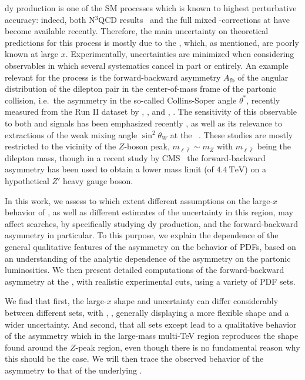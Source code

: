 \acrlong{dy} production is one of the SM processes which is known to highest
perturbative accuracy: indeed, both N$^3$\lo QCD results~\cite{Duhr:2021vwj} and
the full mixed \qcd-\ew corrections at \nnlo
\cite{Buccioni:2020cfi,Buccioni:2022kgy,Bonciani:2020tvf,Bonciani:2021zzf,Armadillo:2022bgm}
have become available recently.
%
Therefore, the main uncertainty on theoretical predictions for this process is
mostly due to the \pdfs, which, as mentioned, are poorly known at large $x$.
%
Experimentally, uncertainties are minimized when considering observables in
which several systematics cancel in part or entirely.
%
An example relevant for the \dy process is the forward-backward asymmetry
$A_{\text{fb}}$ of the angular distribution of the dilepton pair in the
center-of-mass frame of the partonic collision, i.e.\ the asymmetry in the
so-called Collins-Soper angle $\theta^*$, recently measured from the Run II
dataset by \atlas, \cite{ATLAS:2017rue}, and \cms, \cite{CMS:2022uul}.
%
The sensitivity of this observable to both \pdfs and \bsm signals has
been emphasized recently
\cite{Fiaschi:2021sin,Fiaschi:2021okg,Accomando:2019vqt,Accomando:2018nig}, as
well as its relevance to extractions of the weak mixing angle $\sin^2\theta_W$
at the \lhc~\cite{CMS:2018ktx}.
These studies  are mostly restricted to the vicinity of the $Z$-boson peak,
$m_{\ell\bar{\ell}} \sim m_Z$ with $m_{\ell\bar{\ell}}$ being the dilepton
mass, though in a recent study by CMS~\cite{CMS:2022uul} the forward-backward
asymmetry has been used to obtain a lower mass limit (of
$\SI{4.4}{\tera\electronvolt}$) on a hypothetical $Z'$ heavy gauge boson.

In this work, we assess to which extent different assumptions on the large-$x$
behavior of \pdfs, as well as different estimates of the \pdf uncertainty in
this region, may affect \bsm searches, by specifically studying \nc
\acrlong{dy} production, and the forward-backward asymmetry in particular.
To this purpose, we explain the dependence of the general qualitative features
of the asymmetry on the behavior of PDFs, based on an understanding  of the
analytic dependence of the asymmetry on the partonic luminosities.
%
We then present detailed computations of the forward-backward asymmetry at the
\lhc, with realistic experimental cuts, using a variety of PDF sets.

We find that first, the large-$x$ \pdf shape and uncertainty can differ
considerably between different \pdf sets, with ,
\cite{Ball:2021leu}, generally displaying a more flexible shape and a wider
uncertainty.
%
And second, that all \pdf sets except  lead to a qualitative
behavior of the asymmetry which in the large-mass multi-TeV region reproduces
the shape found around the $Z$-peak region, even though there is no fundamental
reason why this should be the case.
%
We will then trace the observed behavior of the asymmetry to that of the
underlying \pdfs.
